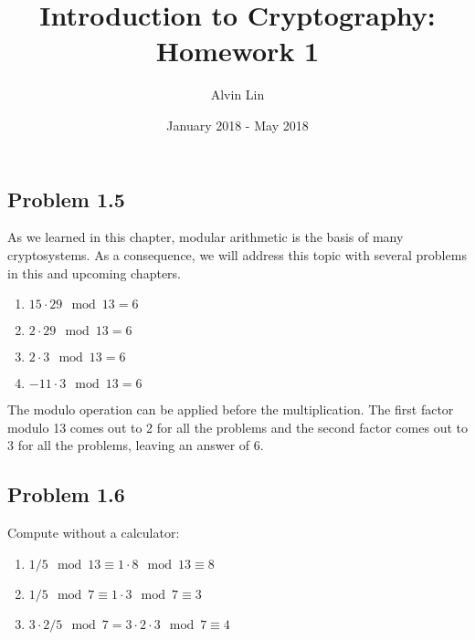 \documentclass{math}
\title{Introduction to Cryptography: Homework 1}
\author{Alvin Lin}
\date{January 2018 - May 2018}
\begin{document}
\maketitle

\subsection*{Problem 1.5}
As we learned in this chapter, modular arithmetic is the basis of many
cryptosystems. As a consequence, we will address this topic with several
problems in this and upcoming chapters.
\begin{enumerate}
  \item \( 15\cdot29\mod13 = 6 \)
  \item \( 2\cdot29\mod13 = 6 \)
  \item \( 2\cdot3\mod13 = 6 \)
  \item \( -11\cdot3\mod13 = 6 \)
\end{enumerate}
The modulo operation can be applied before the multiplication. The first factor
modulo 13 comes out to 2 for all the problems and the second factor comes out to
3 for all the problems, leaving an answer of 6.

\subsection*{Problem 1.6}
Compute without a calculator:
\begin{enumerate}
  \item \( 1/5\mod13 \equiv 1\cdot8\mod13 \equiv 8 \)
  \item \( 1/5\mod7 \equiv 1\cdot3\mod7 \equiv 3 \)
  \item \( 3\cdot2/5\mod7 = 3\cdot2\cdot3\mod7 \equiv 4 \)
\end{enumerate}
\end{document}
